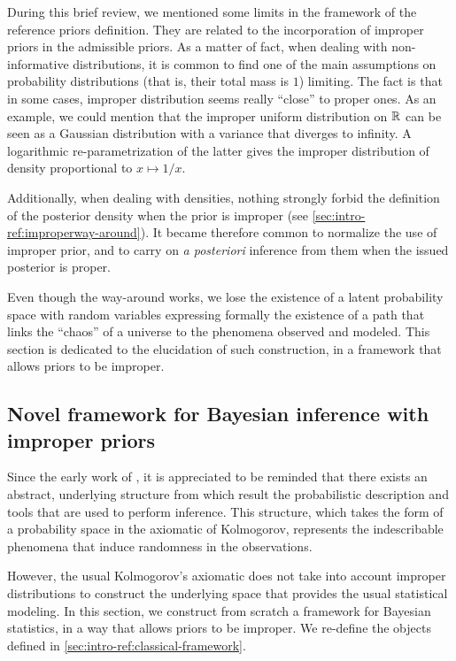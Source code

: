 During this brief review, we mentioned some limits in the framework of the reference priors definition.
They are related to the incorporation of improper priors in the admissible priors. As a matter of fact, when dealing with non-informative distributions, it is common to find one of the main assumptions on probability distributions (that is, their total mass is $1$) limiting.
The fact is that in some cases, improper distribution seems really ``close'' to proper ones.
As an example, we could mention that the improper uniform distribution on $\mathbb{R}$ can be seen as a Gaussian distribution with a variance that diverges to infinity. A logarithmic re-parametrization of the latter gives the improper distribution of density proportional to $x\mapsto1/x$.

Additionally, when dealing with densities, nothing strongly forbid the definition of the posterior density when the prior is improper (see \cref{sec:intro-ref:improperway-around}). It became therefore common to normalize the use of improper prior, and to carry on \emph{a posteriori} inference from them when the issued posterior is proper.

Even though the way-around works, we lose the existence of a latent probability space with random variables expressing formally the existence of a path that links the ``chaos'' of a universe to the phenomena observed and modeled.
This section is dedicated to the elucidation of such construction, in a framework that allows priors to be improper.



\subsection{Novel framework for Bayesian inference with improper priors}\label{sec:intro-ref:novelframework}



Since the early work of \citet{kolmogorov_foundations_1933}, it is appreciated to be reminded that there exists an abstract, underlying structure from which result the probabilistic description and tools that are used to perform inference. This structure, which takes the form of a probability space in the axiomatic of Kolmogorov, represents the indescribable phenomena that induce randomness in the observations.

However, the usual Kolmogorov's axiomatic does not take  into account improper distributions to construct the underlying space that provides the usual statistical modeling. 
In this section, we
construct from scratch a framework for Bayesian statistics, in a way that allows priors to be improper.
We re-define the objects defined in \cref{sec:intro-ref:classical-framework}.

